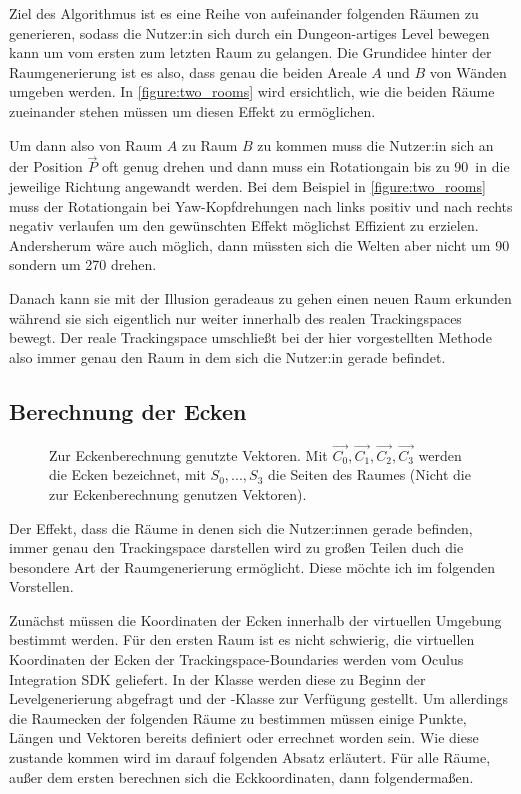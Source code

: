 Ziel des Algorithmus ist es eine Reihe von aufeinander folgenden Räumen zu generieren, sodass die Nutzer:in sich durch ein Dungeon-artiges Level bewegen kann um vom ersten zum letzten Raum zu gelangen.
Die Grundidee hinter der Raumgenerierung ist es also, dass genau die beiden Areale $A$ und $B$ von Wänden umgeben werden. %
In \autoref{figure:two_rooms} wird ersichtlich, wie die beiden Räume zueinander stehen müssen um diesen Effekt zu ermöglichen.

Um dann also von Raum $A$ zu Raum $B$ zu kommen muss die Nutzer:in sich an der Position $\vec{P}$ oft genug drehen und dann muss ein Rotationgain bis zu 90\textdegree\ in die jeweilige Richtung angewandt werden. Bei dem Beispiel in \autoref{figure:two_rooms} muss der Rotationgain bei Yaw-Kopfdrehungen nach links positiv und nach rechts negativ verlaufen um den gewünschten Effekt möglichst Effizient zu erzielen. Andersherum wäre auch möglich, dann müssten sich die Welten aber nicht um
90 \textdegree sondern um 270 \textdegree
drehen.

Danach kann sie mit der Illusion geradeaus zu gehen einen neuen Raum erkunden während sie sich eigentlich nur weiter innerhalb des realen Trackingspaces bewegt. Der reale Trackingspace umschließt bei der hier vorgestellten Methode also immer genau den Raum in dem sich die Nutzer:in gerade befindet.

\subsection{Berechnung der Ecken}
\label{subsection:calccorners}

\begin{figure}[H]
    \centering
    
    \caption{Zur Eckenberechnung genutzte Vektoren. Mit $\vec{C_0}, \vec{C_1}, \vec{C_2}, \vec{C_3}$ werden die Ecken bezeichnet, mit $S_{0}, ...,  S_3$ die Seiten des Raumes (Nicht die zur Eckenberechnung genutzen Vektoren). } %
    \label{figure:calculateCornersFig}
\end{figure}

Der Effekt, dass die Räume in denen sich die Nutzer:innen gerade befinden, immer genau den Trackingspace darstellen wird zu großen Teilen duch die besondere Art der Raumgenerierung ermöglicht. Diese möchte ich im folgenden Vorstellen.

Zunächst müssen die Koordinaten der Ecken innerhalb der virtuellen Umgebung bestimmt werden. Für den ersten Raum ist es nicht schwierig, die virtuellen Koordinaten der Ecken der Trackingspace-Boundaries werden vom Oculus Integration SDK geliefert.
In der  Klasse werden diese zu Beginn der Levelgenerierung abgefragt und der -Klasse zur Verfügung gestellt. Um allerdings die Raumecken der folgenden Räume zu bestimmen müssen einige Punkte, Längen und Vektoren bereits definiert oder errechnet worden sein. Wie diese zustande kommen wird im darauf folgenden Absatz erläutert. Für alle Räume, außer dem ersten berechnen sich die Eckkoordinaten, dann folgendermaßen.

